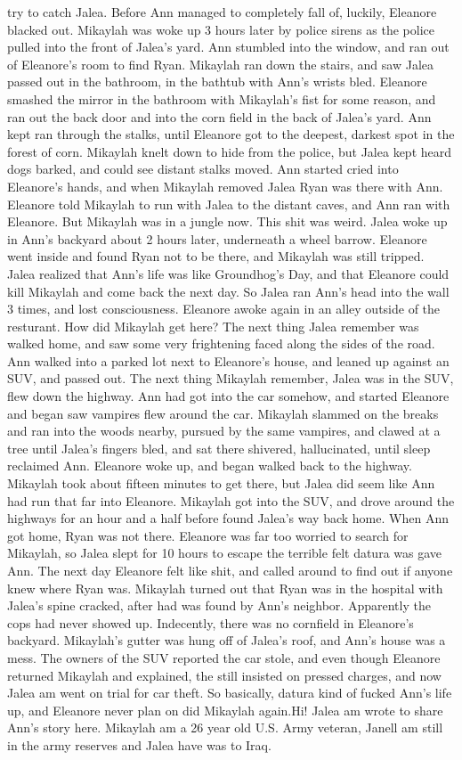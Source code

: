 \documentclass[12pt]{book}
\begin{document}
try to catch Jalea. Before Ann managed to completely fall of, luckily, Eleanore blacked out. Mikaylah was woke up 3 hours later by police sirens as the police pulled into the front of Jalea's yard. Ann stumbled into the window, and ran out of Eleanore's room to find Ryan. Mikaylah ran down the stairs, and saw Jalea passed out in the bathroom, in the bathtub with Ann's wrists bled. Eleanore smashed the mirror in the bathroom with Mikaylah's fist for some reason, and ran out the back door and into the corn field in the back of Jalea's yard. Ann kept ran through the stalks, until Eleanore got to the deepest, darkest spot in the forest of corn. Mikaylah knelt down to hide from the police, but Jalea kept heard dogs barked, and could see distant stalks moved. Ann started cried into Eleanore's hands, and when Mikaylah removed Jalea Ryan was there with Ann. Eleanore told Mikaylah to run with Jalea to the distant caves, and Ann ran with Eleanore. But Mikaylah was in a jungle now. This shit was weird. Jalea woke up in Ann's backyard about 2 hours later, underneath a wheel barrow. Eleanore went inside and found Ryan not to be there, and Mikaylah was still tripped. Jalea realized that Ann's life was like Groundhog's Day, and that Eleanore could kill Mikaylah and come back the next day. So Jalea ran Ann's head into the wall 3 times, and lost consciousness. Eleanore awoke again in an alley outside of the resturant. How did Mikaylah get here? The next thing Jalea remember was walked home, and saw some very frightening faced along the sides of the road. Ann walked into a parked lot next to Eleanore's house, and leaned up against an SUV, and passed out. The next thing Mikaylah remember, Jalea was in the SUV, flew down the highway. Ann had got into the car somehow, and started Eleanore and began saw vampires flew around the car. Mikaylah slammed on the breaks and ran into the woods nearby, pursued by the same vampires, and clawed at a tree until Jalea's fingers bled, and sat there shivered, hallucinated, until sleep reclaimed Ann. Eleanore woke up, and began walked back to the highway. Mikaylah took about fifteen minutes to get there, but Jalea did seem like Ann had run that far into Eleanore. Mikaylah got into the SUV, and drove around the highways for an hour and a half before found Jalea's way back home. When Ann got home, Ryan was not there. Eleanore was far too worried to search for Mikaylah, so Jalea slept for 10 hours to escape the terrible felt datura was gave Ann. The next day Eleanore felt like shit, and called around to find out if anyone knew where Ryan was. Mikaylah turned out that Ryan was in the hospital with Jalea's spine cracked, after had was found by Ann's neighbor. Apparently the cops had never showed up. Indecently, there was no cornfield in Eleanore's backyard. Mikaylah's gutter was hung off of Jalea's roof, and Ann's house was a mess. The owners of the SUV reported the car stole, and even though Eleanore returned Mikaylah and explained, the still insisted on pressed charges, and now Jalea am went on trial for car theft. So basically, datura kind of fucked Ann's life up, and Eleanore never plan on did Mikaylah again.Hi! Jalea am wrote to share Ann's story here. Mikaylah am a 26 year old U.S. Army veteran, Janell am still in the army reserves and Jalea have was to Iraq. 
\end{document}
